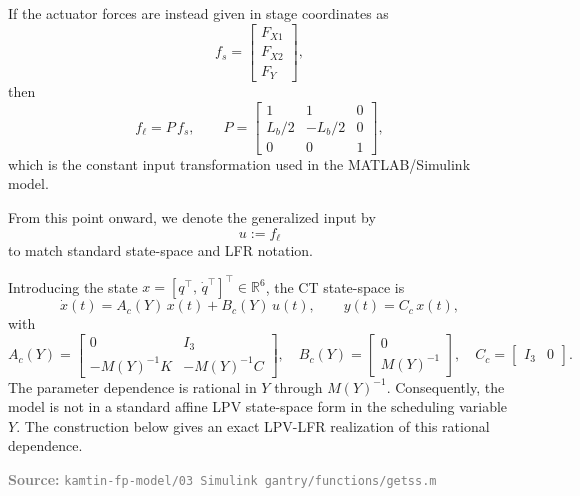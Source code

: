 \documentclass[11pt]{article}
\newcommand{\sourcenote}[1]{%
    \par\vspace{0.4em}%
    \textcolor{gray}{\footnotesize\textbf{Source:} #1}%
}
\newcommand{\R}{\mathbb{R}}
\begin{document}
If the actuator forces are instead given in stage coordinates as
\begin{equation}
    f_s =
    \begin{bmatrix}
        F_{X1} \\
        F_{X2} \\
        F_Y
    \end{bmatrix},
    \label{eq:fs}
\end{equation}
then
\begin{equation}
    f_\ell = P\,f_s,
    \qquad
    P =
    \begin{bmatrix}
        1 & 1 & 0 \\
        L_b/2 & -L_b/2 & 0 \\
        0 & 0 & 1
    \end{bmatrix},
    \label{eq:P_force}
\end{equation}
which is the constant input transformation used in the MATLAB/Simulink model.

From this point onward, we denote the generalized input by
\begin{equation}
    u := f_\ell
    \label{eq:u_def}
\end{equation}
to match standard state-space and LFR notation.

Introducing the state $x = [q^\top,\,\dot{q}^\top]^\top \in \R^6$, the CT state-space is
\begin{equation}
    \dot{x}(t) = A_c(Y)\,x(t) + B_c(Y)\,u(t),
    \qquad
    y(t) = C_c\,x(t),
    \label{eq:ctss}
\end{equation}
with
\begin{equation}
    A_c(Y) = \begin{bmatrix} 0 & I_3 \\ -M(Y)^{-1}K & -M(Y)^{-1}C \end{bmatrix},
    \quad
    B_c(Y) = \begin{bmatrix} 0 \\ M(Y)^{-1} \end{bmatrix},
    \quad
    C_c = \begin{bmatrix} I_3 & 0 \end{bmatrix}.
    \label{eq:ctmatrices}
\end{equation}
The parameter dependence is rational in $Y$ through $M(Y)^{-1}$.
Consequently, the model is not in a standard affine LPV state-space form in the
scheduling variable $Y$.
The construction below gives an exact LPV-LFR realization of this rational dependence.

\sourcenote{\texttt{kamtin-fp-model/03 Simulink gantry/functions/getss.m}}
\end{document}
